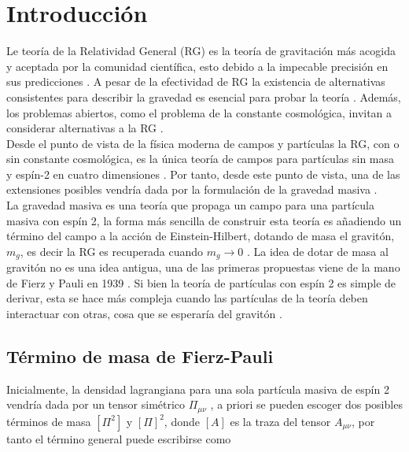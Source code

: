 \chapter{Introducci\'{o}n}

Le teoría de la Relatividad General (RG) es la teoría de gravitación más acogida y aceptada por la comunidad científica, esto debido a la impecable precisión en sus predicciones \cite{MassiveGravity}. A pesar de la efectividad de RG la existencia de alternativas consistentes para describir la gravedad es esencial para probar la teoría \cite{MassiveGravity}. Además, los problemas abiertos, como el problema de la constante cosmológica, invitan a considerar alternativas a la RG \cite{MassiveGravity,TheoreticalAspectsOfMassiveGRavity}.\\

Desde el punto de vista de la física moderna de campos y partículas la RG, con o sin constante cosmológica, es la única teoría de campos para partículas sin masa y espín-2 en cuatro dimensiones \cite{Helicity}. Por tanto, desde este punto de vista, una de las extensiones posibles vendría dada por la formulación de la gravedad masiva \cite{TheoreticalAspectsOfMassiveGRavity}.\\

La gravedad masiva es una teoría que propaga un campo para una partícula masiva con espín 2, la forma más sencilla de construir esta teoría es añadiendo un término del campo a la acción de Einstein-Hilbert, dotando de masa el gravitón, $m_g$, es decir la RG es recuperada cuando  $m_g\rightarrow 0$ \cite{TheoreticalAspectsOfMassiveGRavity}. La idea de dotar de masa al gravitón no es una idea antigua, una de las primeras propuestas viene de la mano de Fierz y Pauli en 1939 \cite{MassiveGravity}. Si bien la teoría de partículas con espín 2 es simple de  derivar, esta se hace más compleja cuando las partículas de la teoría deben interactuar con otras, cosa que se esperaría del gravitón \cite{MassiveGravity}. \\


\section{Término de masa de Fierz-Pauli}

Inicialmente, la densidad lagrangiana para una sola partícula masiva de espín 2 vendría dada por un tensor simétrico $\Pi_{\mu\nu}$  \cite{TheoreticalAspectsOfMassiveGRavity}, a priori se pueden escoger dos posibles términos de masa $[\Pi^2]$ y $[\Pi]^2$\cite{MassiveGravity}, donde $[A]$ es la traza del tensor $A_{\mu\nu}$, por tanto el término general puede escribirse como 

